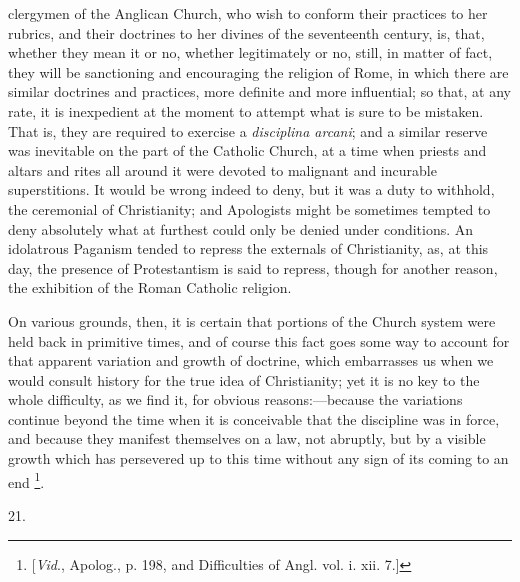 clergymen of the Anglican Church, who wish to conform
their practices to her rubrics, and their doctrines to
her divines of the seventeenth century, is, that, whether
they mean it or no, whether legitimately or no, still, in
matter of fact, they will be sanctioning and encouraging
the religion of Rome, in which there are similar
doctrines and practices, more definite and more
influential; so that, at any rate, it is inexpedient at
the moment to attempt what is sure to be mistaken. That
is, they are required to exercise a \emph{disciplina arcani};
and a similar reserve was inevitable on the part of the
Catholic Church, at a time when priests and altars and
rites all around it were devoted to malignant and
incurable superstitions. It would be wrong indeed to
deny, but it was a duty to withhold, the ceremonial of
Christianity; and Apologists might be sometimes tempted
to deny absolutely what at furthest could only be denied
under conditions. An idolatrous Paganism tended to
repress the externals of Christianity, as, at this day,
the presence of Protestantism is said to repress, though
for another reason, the exhibition of the Roman Catholic
religion.

On various grounds, then, it is certain that portions
of the Church system were held back in primitive times,
and of course this fact goes some way to account for that
apparent variation and growth of doctrine, which
embarrasses us when we would consult history for the true
idea of Christianity; yet it is no key to the whole
difficulty, as we find it, for obvious
reasons:—because the variations continue beyond the
time when it is conceivable that the discipline was in
force, and because they manifest themselves on a law, not
abruptly, but by a visible growth which has persevered up
to this time without any sign of its coming to an end \footnote{[\emph{Vid}., Apolog., p.
198, and Difficulties of Angl. vol. i. xii. 7.]}.

21.

